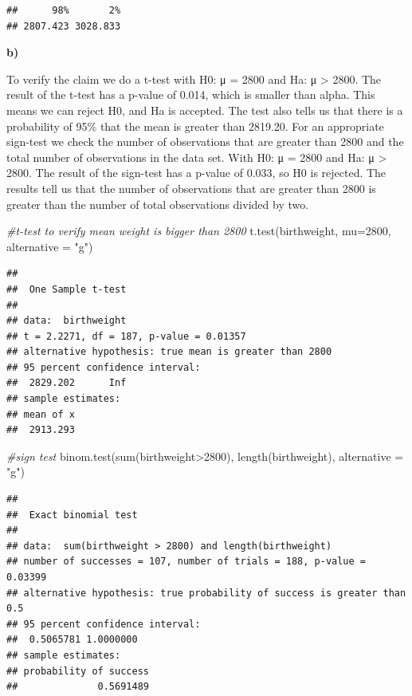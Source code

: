 \documentclass[
]{article}
\newenvironment{Shaded}{\begin{snugshade}}{\end{snugshade}}
\newcommand{\AttributeTok}[1]{\textcolor[rgb]{0.77,0.63,0.00}{#1}}
\newcommand{\CommentTok}[1]{\textcolor[rgb]{0.56,0.35,0.01}{\textit{#1}}}
\newcommand{\DecValTok}[1]{\textcolor[rgb]{0.00,0.00,0.81}{#1}}
\newcommand{\FunctionTok}[1]{\textcolor[rgb]{0.00,0.00,0.00}{#1}}
\newcommand{\NormalTok}[1]{#1}
\newcommand{\SpecialCharTok}[1]{\textcolor[rgb]{0.00,0.00,0.00}{#1}}
\newcommand{\StringTok}[1]{\textcolor[rgb]{0.31,0.60,0.02}{#1}}
\begin{document}
\begin{verbatim}
##      98%       2% 
## 2807.423 3028.833
\end{verbatim}

\textbf{b)}

To verify the claim we do a t-test with H0: μ = 2800 and Ha: μ
\textgreater{} 2800. The result of the t-test has a p-value of 0.014,
which is smaller than alpha. This means we can reject H0, and Ha is
accepted. The test also tells us that there is a probability of 95\%
that the mean is greater than 2819.20. For an appropriate sign-test we
check the number of observations that are greater than 2800 and the
total number of observations in the data set. With H0: μ = 2800 and Ha:
μ \textgreater{} 2800. The result of the sign-test has a p-value of
0.033, so H0 is rejected. The results tell us that the number of
observations that are greater than 2800 is greater than the number of
total observations divided by two.

\begin{Shaded}
\begin{Highlighting}[]
\CommentTok{\#t{-}test to verify mean weight is bigger than 2800}
\FunctionTok{t.test}\NormalTok{(birthweight, }\AttributeTok{mu=}\DecValTok{2800}\NormalTok{, }\AttributeTok{alternative =} \StringTok{"g"}\NormalTok{)}
\end{Highlighting}
\end{Shaded}

\begin{verbatim}
## 
##  One Sample t-test
## 
## data:  birthweight
## t = 2.2271, df = 187, p-value = 0.01357
## alternative hypothesis: true mean is greater than 2800
## 95 percent confidence interval:
##  2829.202      Inf
## sample estimates:
## mean of x 
##  2913.293
\end{verbatim}

\begin{Shaded}
\begin{Highlighting}[]
\CommentTok{\#sign test}
\FunctionTok{binom.test}\NormalTok{(}\FunctionTok{sum}\NormalTok{(birthweight}\SpecialCharTok{\textgreater{}}\DecValTok{2800}\NormalTok{), }\FunctionTok{length}\NormalTok{(birthweight), }\AttributeTok{alternative =} \StringTok{"g"}\NormalTok{)}
\end{Highlighting}
\end{Shaded}

\begin{verbatim}
## 
##  Exact binomial test
## 
## data:  sum(birthweight > 2800) and length(birthweight)
## number of successes = 107, number of trials = 188, p-value = 0.03399
## alternative hypothesis: true probability of success is greater than 0.5
## 95 percent confidence interval:
##  0.5065781 1.0000000
## sample estimates:
## probability of success 
##              0.5691489
\end{verbatim}
\end{document}
